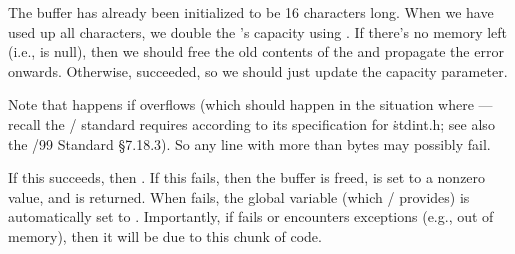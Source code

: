 The  buffer has already been initialized to be 16 characters
long.
When we have used up all characters, we double the 's capacity
using
. If there's no memory left (i.e.,  is null),
then we
should free the old contents of the  and propagate the error
onwards. Otherwise,  succeeded, so we should just update
the capacity parameter.

Note that  happens if  overflows
(which should
happen in the situation where ---recall the %
\POSIX/
standard requires 
according to its specification
for \.{stdint.h}; see also the \CEE/99 Standard \S7.18.3). So any line with
more than  bytes may
possibly fail.

If this succeeds, then . If this fails, then the 
buffer is freed,  is set to a nonzero value, and \PB{$\NULL$} is
returned.
When  fails, the  global variable (which \POSIX/
provides) is automatically set to . Importantly, if 
fails or encounters exceptions (e.g., out of memory), then it will be
due to this chunk of code.



